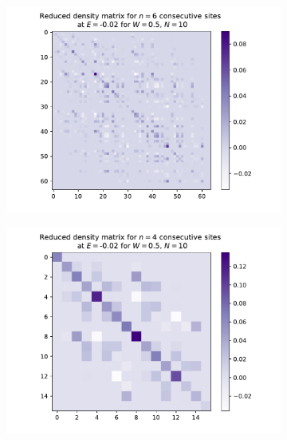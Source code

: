 \documentclass[reprint,amsmath,amssymb,aps,prb]{revtex4-2}
\begin{document}
\begin{center}%
	\begin{figure}[h!]
		\begin{subfigure}[c]{0.45\textwidth}
			\includegraphics[width=\linewidth]{../results/groundstates/N10n6_trainingset_groundstate_Wmax0.5}
		\end{subfigure}
		\begin{subfigure}[c]{0.45\textwidth}
			\includegraphics[width=\linewidth]{../results/groundstates/N10n4_trainingset_groundstate_Wmax0.5}

\end{subfigure}
\end{figure}
\end{center}
\end{document}
